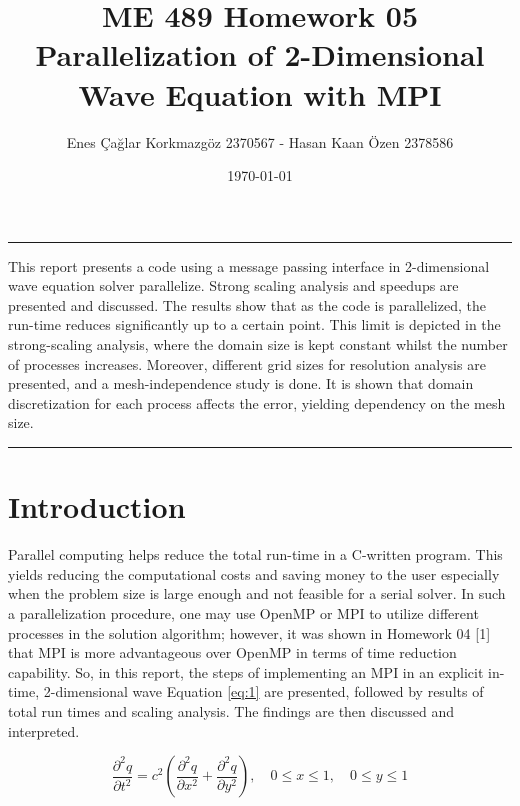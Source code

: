 \documentclass[12pt]{article}
\title{ME 489 Homework 05 \\ Parallelization of 2-Dimensional Wave Equation with MPI}
\date{\today}
\author{Enes Çağlar Korkmazgöz 2370567 - Hasan Kaan Özen 2378586}
\renewenvironment{abstract}
{\quotation
  {\large\bfseries\abstractname\centering\par\noindent\rule{\linewidth}{.5pt}\medskip}
  \noindent}
{\par\noindent\rule{\linewidth}{.5pt}\endquotation}
\begin{document}
\maketitle

\begin{abstract}
This report presents a code using a message passing interface in 2-dimensional wave equation solver parallelize. Strong scaling analysis and speedups are presented and discussed. The results show that as the code is parallelized, the run-time reduces significantly up to a certain point. This limit is depicted in the strong-scaling analysis, where the domain size is kept constant whilst the number of processes increases. Moreover, different grid sizes for resolution analysis are presented, and a mesh-independence study is done. It is shown that domain discretization for each process affects the error, yielding dependency on the mesh size.
\end{abstract}
\newpage
\tableofcontents
\newpage
\section{Introduction}

\noindent
Parallel computing helps reduce the total run-time in a C-written program. This yields reducing the computational costs and saving money to the user especially when the problem size is large enough and not feasible for a serial solver. In such a parallelization procedure, one may use OpenMP or MPI to utilize different processes in the solution algorithm; however, it was shown in Homework 04 [1] that MPI is more advantageous over OpenMP in terms of time reduction capability. So, in this report, the steps of implementing an MPI in an explicit in-time,  2-dimensional wave Equation \ref{eq:1} are presented, followed by results of total run times and scaling analysis. The findings are then discussed and interpreted.


\begin{equation}
\label{eq:1}
\frac{\partial^2 q}{\partial t^2} = c^2 \left( \frac{\partial^2 q}{\partial x^2} + \frac{\partial^2 q}{\partial y^2} \right), \quad 0 \leq x \leq 1, \quad 0 \leq y \leq 1
\end{equation}
\end{document}
